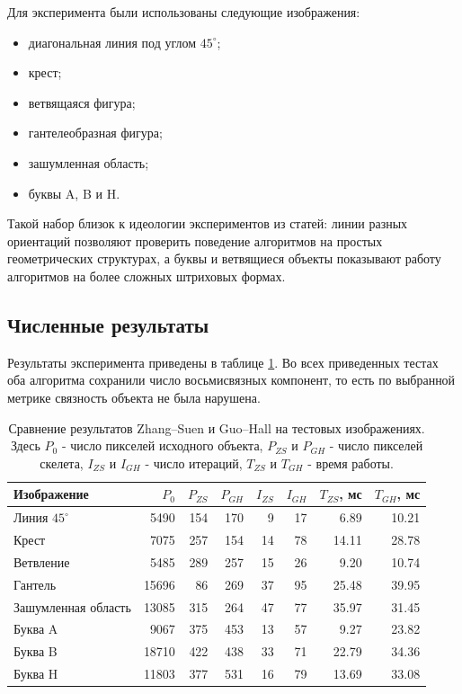 \documentclass[12pt,a4paper]{article}
\begin{document}
Для эксперимента были использованы следующие изображения:

\begin{itemize}
    \item диагональная линия под углом $45^\circ$;
    \item крест;
    \item ветвящаяся фигура;
    \item гантелеобразная фигура;
    \item зашумленная область;
    \item буквы A, B и H.
\end{itemize}

Такой набор близок к идеологии экспериментов из статей: линии разных ориентаций позволяют проверить поведение алгоритмов на простых геометрических структурах, а буквы и ветвящиеся объекты показывают работу алгоритмов на более сложных штриховых формах.

\subsection{Численные результаты}

Результаты эксперимента приведены в таблице \ref{tab:own_results}. Во всех приведенных тестах оба алгоритма сохранили число восьмисвязных компонент, то есть по выбранной метрике связность объекта не была нарушена.

\begin{table}[H]
\centering
\small
\begin{tabular}{lrrrrrrr}
\toprule
Изображение & $P_0$ & $P_{ZS}$ & $P_{GH}$ & $I_{ZS}$ & $I_{GH}$ & $T_{ZS}$, мс & $T_{GH}$, мс \\
\midrule
Линия $45^\circ$ & 5490 & 154 & 170 & 9 & 17 & 6.89 & 10.21 \\
Крест & 7075 & 257 & 154 & 14 & 78 & 14.11 & 28.78 \\
Ветвление & 5485 & 289 & 257 & 15 & 26 & 9.20 & 10.74 \\
Гантель & 15696 & 86 & 269 & 37 & 95 & 25.48 & 39.95 \\
Зашумленная область & 13085 & 315 & 264 & 47 & 77 & 35.97 & 31.45 \\
Буква A & 9067 & 375 & 453 & 13 & 57 & 9.27 & 23.82 \\
Буква B & 18710 & 422 & 438 & 33 & 71 & 22.79 & 34.36 \\
Буква H & 11803 & 377 & 531 & 16 & 79 & 13.69 & 33.08 \\
\bottomrule
\end{tabular}
\caption{Сравнение результатов Zhang--Suen и Guo--Hall на тестовых изображениях. Здесь $P_0$ - число пикселей исходного объекта, $P_{ZS}$ и $P_{GH}$ - число пикселей скелета, $I_{ZS}$ и $I_{GH}$ - число итераций, $T_{ZS}$ и $T_{GH}$ - время работы.}
\label{tab:own_results}
\end{table}
\end{document}

